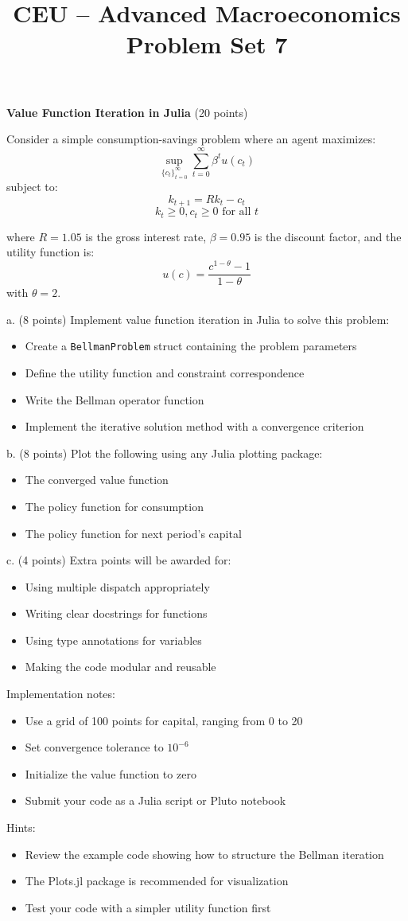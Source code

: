\documentclass[12pt]{article}
\title{\Large CEU -- Advanced Macroeconomics\\[0.5em]Problem Set 7}
\author{}
\date{}
\begin{document}
\maketitle

\noindent\textbf{Value Function Iteration in Julia} (20 points)

Consider a simple consumption-savings problem where an agent maximizes:
\[
\sup_{\{c_t\}_{t=0}^{\infty}} \sum_{t=0}^{\infty} \beta^t u(c_t)
\]
subject to:
\[
k_{t+1} = Rk_t - c_t
\]
\[
k_t \geq 0, c_t \geq 0 \text{ for all } t
\]

where $R = 1.05$ is the gross interest rate, $\beta = 0.95$ is the discount factor, and the utility function is:
\[
u(c) = \frac{c^{1-\theta} - 1}{1-\theta}
\]
with $\theta = 2$.

a. (8 points) Implement value function iteration in Julia to solve this problem:
   \begin{itemize}
   \item Create a \texttt{BellmanProblem} struct containing the problem parameters
   \item Define the utility function and constraint correspondence
   \item Write the Bellman operator function
   \item Implement the iterative solution method with a convergence criterion
   \end{itemize}

b. (8 points) Plot the following using any Julia plotting package:
   \begin{itemize}
   \item The converged value function
   \item The policy function for consumption
   \item The policy function for next period's capital
   \end{itemize}

c. (4 points) Extra points will be awarded for:
   \begin{itemize}
   \item Using multiple dispatch appropriately
   \item Writing clear docstrings for functions
   \item Using type annotations for variables
   \item Making the code modular and reusable
   \end{itemize}

Implementation notes:
\begin{itemize}
\item Use a grid of 100 points for capital, ranging from 0 to 20
\item Set convergence tolerance to $10^{-6}$
\item Initialize the value function to zero
\item Submit your code as a Julia script or Pluto notebook
\end{itemize}

Hints:
\begin{itemize}
\item Review the example code showing how to structure the Bellman iteration
\item The Plots.jl package is recommended for visualization
\item Test your code with a simpler utility function first
\end{itemize}
\end{document}
